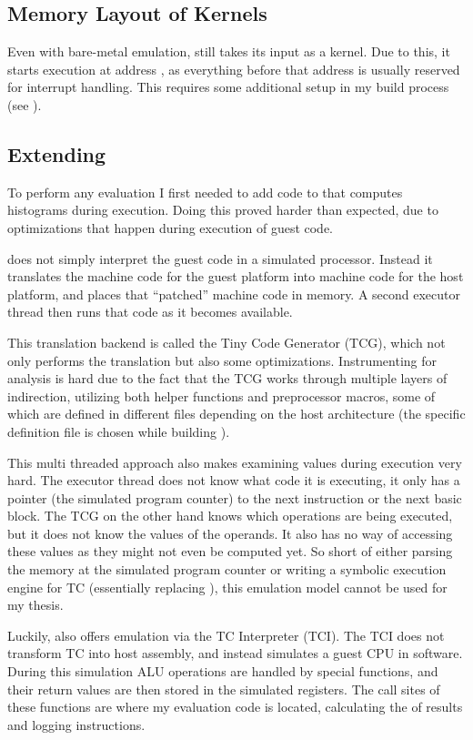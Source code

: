 \subsection{Memory Layout of \qemu{} Kernels}
\label{memory}
Even with bare-metal emulation, \qemu{} still takes its input as a kernel.
Due to this, it starts execution at address , as everything before that address is usually reserved for interrupt handling.
This requires some additional setup in my build process (see ).

\subsection{Extending \qemu{}}
To perform any evaluation I first needed to add code to \qemu{} that computes \hammingw{} histograms during execution.
Doing this proved harder than expected, due to optimizations that happen during execution of guest code.

\qemu{} does not simply interpret the guest code in a simulated processor.
Instead it translates the machine code for the guest platform into machine code for the host platform, and places that ``patched'' machine code in memory.
A second executor thread then runs that code as it becomes available.

This translation backend is called the Tiny Code Generator (TCG), which not only performs the translation but also some optimizations.
Instrumenting \qemu{} for analysis is hard due to the fact that the TCG works through multiple layers of indirection, utilizing both helper functions and preprocessor macros, some of which are defined in different files depending on the host architecture (the specific definition file is chosen while building \qemu{}).

This multi threaded approach also makes examining values during execution very hard.
The executor thread does not know what code it is executing, it only has a pointer (the simulated program counter) to the next instruction or the next basic block.
The TCG on the other hand knows which operations are being executed, but it does not know the values of the operands.
It also has no way of accessing these values as they might not even be computed yet.
So short of either parsing the memory at the simulated program counter or writing a symbolic execution engine for TC (essentially replacing \qemu{}), this emulation model cannot be used for my thesis.

Luckily, \qemu{} also offers emulation via the TC Interpreter (TCI).
The TCI does not transform TC into host assembly, and instead simulates a guest CPU in software.
During this simulation ALU operations are handled by special functions, and their return values are then stored in the simulated registers.
The call sites of these functions are where my evaluation code is located, calculating the \hammingw{} of results and logging instructions.

